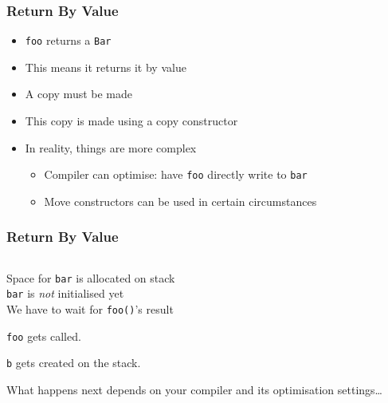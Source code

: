 \begin{frame}
  \frametitle{Return By Value}
  \begin{itemize}
    \item {\tt foo} returns a {\tt Bar}
    \item This means it returns it by value
    \item A copy must be made
    \item This copy is made using a copy constructor
    \item In reality, things are more complex
          \begin{itemize}
            \item Compiler can optimise: have {\tt foo} directly write to {\tt bar}
            \item Move constructors can be used in certain circumstances
          \end{itemize}
  \end{itemize}
\end{frame}

\begin{frame}
  \frametitle{Return By Value}
  \begin{center}
    \begin{columns}
      \column{4cm}
      \column{4cm}
    \end{columns}
  \end{center}
  \vskip2mm
  \begin{overprint}
    \begin{center}
      Space for {\tt bar} is allocated on stack \\
      {\tt bar} is \emph{not} initialised yet \\
      We have to wait for {\tt foo()}'s result
    \end{center}

    \begin{center}
      {\tt foo} gets called.
    \end{center}

    \begin{center}
      {\tt b} gets created on the stack.
    \end{center}

    \begin{center}
      What happens next depends on your compiler and its optimisation settings\dots
    \end{center}
  \end{overprint}
\end{frame}

